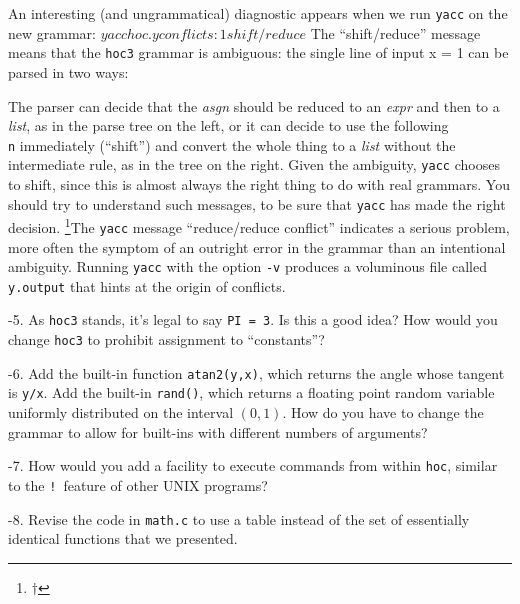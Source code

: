 {An interesting (and ungrammatical) diagnostic appears when
we run {\tt yacc} on the new grammar:
\begincode
$ yacc hoc.y
conflicts: 1 shift/reduce
$
\endcode
\noindent
The ``shift/reduce'' message means that the {\tt hoc3} grammar
is ambiguous: the single line of input
\begincode
x = 1
\endcode
\noindent
can be parsed in two ways:
\medskip
\centerline{\hfil{}}
\medskip
\noindent
The parser can decide that the {\it asgn\/} should be reduced to
an {\it expr\/} and then to a {\it list}, as in the parse tree on
the left, or it can decide to use the following {\tt\\n} immediately
(``shift'') and convert the whole thing to a {\it list\/} without
the intermediate rule, as in the tree on the right. Given the
ambiguity, {\tt yacc} chooses to shift, since this is almost always
the right thing to do with real grammars. You should try to understand
such messages, to be sure that {\tt yacc} has made the right decision.%
\footnote{$\dag$}{\ninepoint The {\tt yacc} message ``reduce/reduce
conflict'' indicates a serious problem, more often the symptom of an
outright error in the grammar than an intentional ambiguity.}
Running {\tt yacc} with the option {\tt-v} produces a voluminous
file called {\tt y.output} that hints at the origin of conflicts.

-5.
As {\tt hoc3} stands, it's legal to say {\tt PI = 3}. Is this a good
idea? How would you change {\tt hoc3} to prohibit assignment to
``constants''?\endexercise

-6.
Add the built-in function {\tt atan2(y,x)}, which returns the angle
whose tangent is {\tt y/x}. Add the built-in {\tt rand()}, which
returns a floating point random variable uniformly distributed on
the interval $(0,1)$. How do you have to change the grammar to allow
for built-ins with different numbers of arguments?\endexercise

-7.
How would you add a facility to execute commands from within {\tt hoc},
similar to the {\tt!}~feature of other {\sc UNIX} programs?\endexercise

-8.
Revise the code in {\tt math.c} to use a table instead of the set
of essentially identical functions that we presented.\endexercise

}
